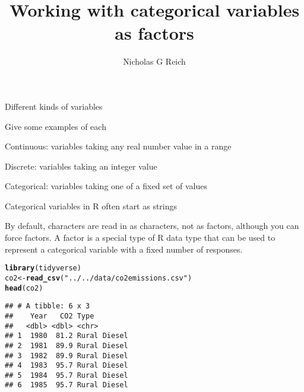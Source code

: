 \documentclass[table]{beamer}\usepackage[]{graphicx}\usepackage[]{color}
\title{Working with categorical variables as factors}
\author{Nicholas G Reich}
\makeatletter
\newcommand{\hlstr}[1]{\textcolor[rgb]{0.192,0.494,0.8}{#1}}%
\newcommand{\hlstd}[1]{\textcolor[rgb]{0.345,0.345,0.345}{#1}}%
\newcommand{\hlkwb}[1]{\textcolor[rgb]{0.69,0.353,0.396}{#1}}%
\newcommand{\hlkwd}[1]{\textcolor[rgb]{0.737,0.353,0.396}{\textbf{#1}}}%
\newenvironment{kframe}{%
 \def\at@end@of@kframe{}%
 \ifinner\ifhmode%
  \def\at@end@of@kframe{\end{minipage}}%
  \begin{minipage}{\columnwidth}%
 \fi\fi%
 \def\FrameCommand##1{\hskip\@totalleftmargin \hskip-\fboxsep
 \colorbox{shadecolor}{##1}\hskip-\fboxsep
     \hskip-\linewidth \hskip-\@totalleftmargin \hskip\columnwidth}%
 \MakeFramed {\advance\hsize-\width
   \@totalleftmargin\z@ \linewidth\hsize
   \@setminipage}}%
 {\par\unskip\endMakeFramed%
 \at@end@of@kframe}
\newenvironment{knitrout}{}{} %
\makeatother
\begin{document}
\begin{frame}[plain]
	\titlepage
\end{frame}






\begin{frame}{Different kinds of variables}
\begin{block}{Give some examples of each}

\bi
    \item Continuous: variables taking any real number value in a range
    \vspace{4em}
    \item Discrete: variables taking an integer value
    \vspace{4em}
    \item Categorical: variables taking one of a fixed set of values
\ei

\end{block}

\end{frame}



\begin{frame}[fragile]{Categorical variables in R often start as strings}

By default, characters are read in as characters, not as factors, although you can force factors.
A factor is a special type of R data type that can be used to represent a categorical variable with a fixed number of responses.

\begin{knitrout}\tiny
{}\color{fgcolor}\begin{kframe}
\begin{alltt}
\hlkwd{library}\hlstd{(tidyverse)}
\hlstd{co2} \hlkwb{<-} \hlkwd{read_csv}\hlstd{(}\hlstr{"../../data/co2emissions.csv"}\hlstd{)}
\hlkwd{head}\hlstd{(co2)}
\end{alltt}
\begin{verbatim}
## # A tibble: 6 x 3
##    Year   CO2 Type        
##   <dbl> <dbl> <chr>       
## 1  1980  81.2 Rural Diesel
## 2  1981  89.9 Rural Diesel
## 3  1982  89.9 Rural Diesel
## 4  1983  95.7 Rural Diesel
## 5  1984  95.7 Rural Diesel
## 6  1985  95.7 Rural Diesel
\end{verbatim}
\end{kframe}
\end{knitrout}


\end{frame}
\end{document}
